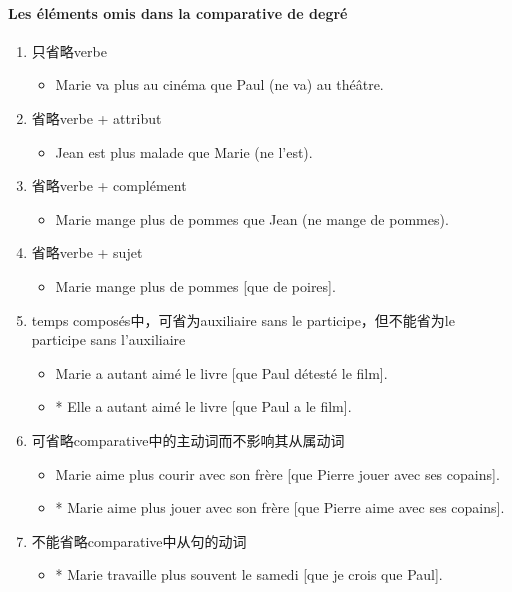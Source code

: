 \documentclass[UTF8]{report}
\begin{document}
\paragraph{Les éléments omis dans la comparative de degré}
\begin{enumerate}
    \item 只省略verbe
    \begin{itemize}
        \item Marie va plus au cinéma que Paul (ne va) au théâtre.
    \end{itemize}
    \item 省略verbe + attribut
    \begin{itemize}
        \item Jean est plus malade que Marie (ne l’est).
    \end{itemize}
    \item 省略verbe + complément
    \begin{itemize}
        \item Marie mange plus de pommes que Jean (ne mange de pommes).
    \end{itemize}
    \item 省略verbe + sujet
    \begin{itemize}
        \item Marie mange plus de pommes [que de poires].
    \end{itemize}
    \item temps composés中，可省为auxiliaire sans le participe，但不能省为le participe sans l’auxiliaire
    \begin{itemize}
        \item Marie a autant aimé le livre [que Paul détesté le film].
        \item * Elle a autant aimé le livre [que Paul a le film].
    \end{itemize}
    \item 可省略comparative中的主动词而不影响其从属动词
    \begin{itemize}
        \item Marie aime plus courir avec son frère [que Pierre jouer avec ses copains].
        \item * Marie aime plus jouer avec son frère [que Pierre aime avec ses copains].
    \end{itemize}
    \item 不能省略comparative中从句的动词
    \begin{itemize}
        \item * Marie travaille plus souvent le samedi [que je crois que Paul].
    \end{itemize}
\end{enumerate}
\end{document}
